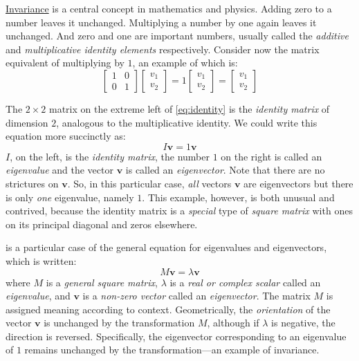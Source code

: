 \documentclass[
  11pt,
  british,
  a4paper,
]{article}
\begin{document}
\href{http://mathworld.wolfram.com/Invariant.html}{Invariance} is a
central concept in mathematics and physics. Adding zero to a number
leaves it unchanged. Multiplying a number by one again leaves it
unchanged. And zero and one are important numbers, usually called the
\emph{additive} and \emph{multiplicative identity elements}
respectively. Consider now the matrix equivalent of multiplying by
\(1\), an example of which is: \begin{equation}
\begin{bmatrix}1 & 0\\0 & 1\end{bmatrix}\begin{bmatrix}v_{1}\\v_{2}\end{bmatrix}
= 1\begin{bmatrix}v_{1}\\v_{2}\end{bmatrix} = \begin{bmatrix}v_{1}\\v_{2}\end{bmatrix}
\label{eq:identity}\end{equation}

The \(2 \times 2\) matrix on the extreme left of \cref{eq:identity} is
the \emph{identity matrix} of dimension \(2\), analogous to the
multiplicative identity. We could write this equation more succinctly
as: \begin{equation}
I\symbf{v} = 1\symbf{v}
\label{eq:succinct}\end{equation} \(I\), on the left, is the
\emph{identity matrix}, the number \(1\) on the right is called an
\emph{eigenvalue} and the vector \(\symbf{v}\) is called an
\emph{eigenvector}. Note that there are no strictures on \(\symbf{v}\).
So, in this particular case, \emph{all} vectors \(\symbf{v}\) are
eigenvectors but there is only \emph{one} eigenvalue, namely \(1\). This
example, however, is both unusual and contrived, because the identity
matrix is a \emph{special} type of \emph{square matrix} with ones on its
principal diagonal and zeros elsewhere.

 is a particular case of the general equation for
eigenvalues and eigenvectors, which is written: \begin{equation}
M\symbf{v} = \lambda \symbf{v}
\label{eq:eigen}\end{equation} where \(M\) is a \emph{general square
matrix}, \({\lambda}\) is a \emph{real or complex scalar} called an
\emph{eigenvalue}, and \(\symbf{v}\) is a \emph{non-zero vector} called
an \emph{eigenvector}. The matrix \(M\) is assigned meaning according to
context. Geometrically, the \emph{orientation} of the vector
\(\symbf{v}\) is unchanged by the transformation \(M\), although if
\(\lambda\) is negative, the direction is reversed. Specifically, the
eigenvector corresponding to an eigenvalue of \(1\) remains unchanged by
the transformation---an example of invariance.
\end{document}
